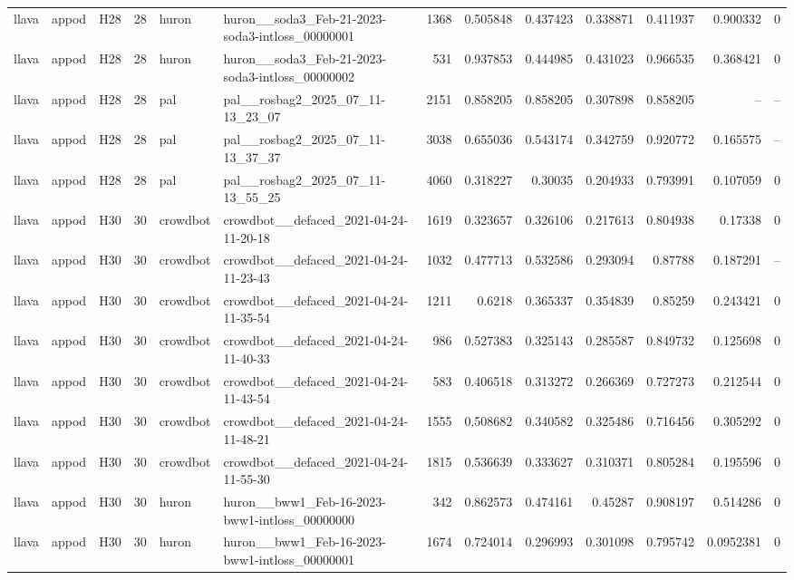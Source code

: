 \begin{longtable}{lllrllrrrrrrr}
llava & appod & H28 & 28 & huron & huron\_\_soda3\_Feb-21-2023-soda3-intloss\_00000001 & 1368 & 0.505848 & 0.437423 & 0.338871 & 0.411937 & 0.900332 & 0 \\
llava & appod & H28 & 28 & huron & huron\_\_soda3\_Feb-21-2023-soda3-intloss\_00000002 & 531 & 0.937853 & 0.444985 & 0.431023 & 0.966535 & 0.368421 & 0 \\
llava & appod & H28 & 28 & pal & pal\_\_rosbag2\_2025\_07\_11-13\_23\_07 & 2151 & 0.858205 & 0.858205 & 0.307898 & 0.858205 & -- & -- \\
llava & appod & H28 & 28 & pal & pal\_\_rosbag2\_2025\_07\_11-13\_37\_37 & 3038 & 0.655036 & 0.543174 & 0.342759 & 0.920772 & 0.165575 & -- \\
llava & appod & H28 & 28 & pal & pal\_\_rosbag2\_2025\_07\_11-13\_55\_25 & 4060 & 0.318227 & 0.30035 & 0.204933 & 0.793991 & 0.107059 & 0 \\
llava & appod & H30 & 30 & crowdbot & crowdbot\_\_defaced\_2021-04-24-11-20-18 & 1619 & 0.323657 & 0.326106 & 0.217613 & 0.804938 & 0.17338 & 0 \\
llava & appod & H30 & 30 & crowdbot & crowdbot\_\_defaced\_2021-04-24-11-23-43 & 1032 & 0.477713 & 0.532586 & 0.293094 & 0.87788 & 0.187291 & -- \\
llava & appod & H30 & 30 & crowdbot & crowdbot\_\_defaced\_2021-04-24-11-35-54 & 1211 & 0.6218 & 0.365337 & 0.354839 & 0.85259 & 0.243421 & 0 \\
llava & appod & H30 & 30 & crowdbot & crowdbot\_\_defaced\_2021-04-24-11-40-33 & 986 & 0.527383 & 0.325143 & 0.285587 & 0.849732 & 0.125698 & 0 \\
llava & appod & H30 & 30 & crowdbot & crowdbot\_\_defaced\_2021-04-24-11-43-54 & 583 & 0.406518 & 0.313272 & 0.266369 & 0.727273 & 0.212544 & 0 \\
llava & appod & H30 & 30 & crowdbot & crowdbot\_\_defaced\_2021-04-24-11-48-21 & 1555 & 0.508682 & 0.340582 & 0.325486 & 0.716456 & 0.305292 & 0 \\
llava & appod & H30 & 30 & crowdbot & crowdbot\_\_defaced\_2021-04-24-11-55-30 & 1815 & 0.536639 & 0.333627 & 0.310371 & 0.805284 & 0.195596 & 0 \\
llava & appod & H30 & 30 & huron & huron\_\_bww1\_Feb-16-2023-bww1-intloss\_00000000 & 342 & 0.862573 & 0.474161 & 0.45287 & 0.908197 & 0.514286 & 0 \\
llava & appod & H30 & 30 & huron & huron\_\_bww1\_Feb-16-2023-bww1-intloss\_00000001 & 1674 & 0.724014 & 0.296993 & 0.301098 & 0.795742 & 0.0952381 & 0 \\

\end{longtable}
